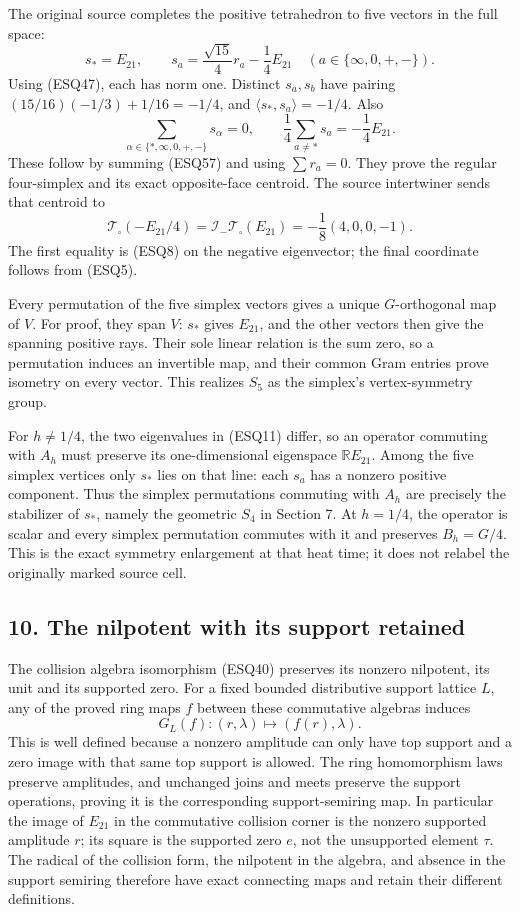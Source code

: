 \documentclass[
  10pt,
  a4paper,
]{article}
\begin{document}
The original source completes the positive tetrahedron to five vectors
in the full space: \[
s_*=E_{21},\qquad
s_a=\frac{\sqrt{15}}4r_a-\frac14E_{21}
\quad(a\in\{\infty,0,+,-\}).
\tag{ESQ57}
\] Using (ESQ47), each has norm one. Distinct \(s_a,s_b\) have pairing
\((15/16)(-1/3)+1/16=-1/4\), and \(\langle s_*,s_a\rangle=-1/4\). Also
\[
\sum_{\alpha\in\{*,\infty,0,+,-\}}s_\alpha=0,
\qquad \frac14\sum_{a\ne *}s_a=-\frac14E_{21}.
\tag{ESQ58}
\] These follow by summing (ESQ57) and using \(\sum r_a=0\). They prove
the regular four-simplex and its exact opposite-face centroid. The
source intertwiner sends that centroid to \[
\mathcal T_\square(-E_{21}/4)
=\mathcal I_-\mathcal T_\square(E_{21})
=-\frac18(4,0,0,-1).
\tag{ESQ59}
\] The first equality is (ESQ8) on the negative eigenvector; the final
coordinate follows from (ESQ5).

Every permutation of the five simplex vectors gives a unique
\(G\)-orthogonal map of \(V\). For proof, they span \(V\): \(s_*\) gives
\(E_{21}\), and the other vectors then give the spanning positive rays.
Their sole linear relation is the sum zero, so a permutation induces an
invertible map, and their common Gram entries prove isometry on every
vector. This realizes \(S_5\) as the simplex's vertex-symmetry group.

For \(h\ne1/4\), the two eigenvalues in (ESQ11) differ, so an operator
commuting with \(A_h\) must preserve its one-dimensional eigenspace
\(\mathbb RE_{21}\). Among the five simplex vertices only \(s_*\) lies
on that line: each \(s_a\) has a nonzero positive component. Thus the
simplex permutations commuting with \(A_h\) are precisely the stabilizer
of \(s_*\), namely the geometric \(S_4\) in Section 7. At \(h=1/4\), the
operator is scalar and every simplex permutation commutes with it and
preserves \(B_h=G/4\). This is the exact symmetry enlargement at that
heat time; it does not relabel the originally marked source cell.

\subsection{10. The nilpotent with its support
retained}\label{the-nilpotent-with-its-support-retained}

The collision algebra isomorphism (ESQ40) preserves its nonzero
nilpotent, its unit and its supported zero. For a fixed bounded
distributive support lattice \(L\), any of the proved ring maps \(f\)
between these commutative algebras induces \[
G_L(f):(r,\lambda)\longmapsto(f(r),\lambda).
\tag{ESQ60}
\] This is well defined because a nonzero amplitude can only have top
support and a zero image with that same top support is allowed. The ring
homomorphism laws preserve amplitudes, and unchanged joins and meets
preserve the support operations, proving it is the corresponding
support-semiring map. In particular the image of \(E_{21}\) in the
commutative collision corner is the nonzero supported amplitude \(r\);
its square is the supported zero \(e\), not the unsupported element
\(\tau\). The radical of the collision form, the nilpotent in the
algebra, and absence in the support semiring therefore have exact
connecting maps and retain their different definitions.
\end{document}
